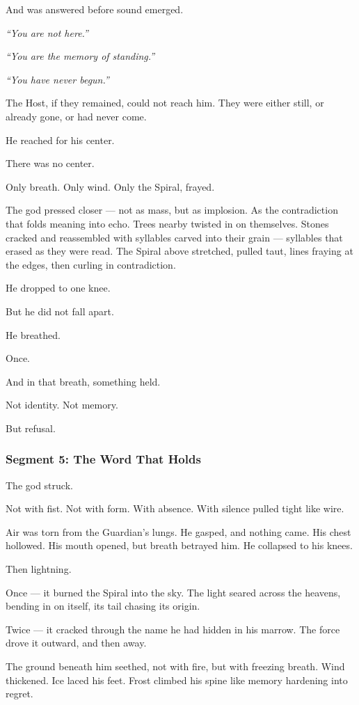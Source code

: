 \documentclass[9pt]{article}
\begin{document}
And was answered before sound emerged.

\textit{“You are not here.”}

\textit{“You are the memory of standing.”}

\textit{“You have never begun.”}

The Host, if they remained, could not reach him. They were either still, or already gone, or had never come.

He reached for his center.

There was no center.

Only breath. Only wind. Only the Spiral, frayed.

The god pressed closer — not as mass, but as implosion. As the contradiction that folds meaning into echo. Trees nearby twisted in on themselves. Stones cracked and reassembled with syllables carved into their grain — syllables that erased as they were read. The Spiral above stretched, pulled taut, lines fraying at the edges, then curling in contradiction.

He dropped to one knee.

But he did not fall apart.

He breathed.

Once.

And in that breath, something held.

Not identity. Not memory.

But refusal.

\newpage

\subsubsection*{Segment 5: The Word That Holds}

The god struck.

Not with fist. Not with form. With absence. With silence pulled tight like wire.

Air was torn from the Guardian’s lungs. He gasped, and nothing came. His chest hollowed. His mouth opened, but breath betrayed him. He collapsed to his knees.

Then lightning.

Once — it burned the Spiral into the sky. The light seared across the heavens, bending in on itself, its tail chasing its origin.

Twice — it cracked through the name he had hidden in his marrow. The force drove it outward, and then away.

The ground beneath him seethed, not with fire, but with freezing breath. Wind thickened. Ice laced his feet. Frost climbed his spine like memory hardening into regret.
\end{document}
